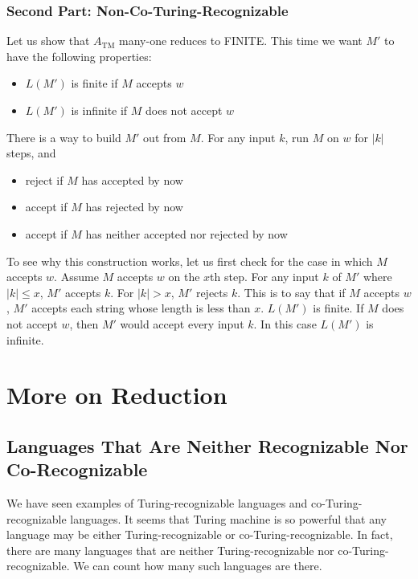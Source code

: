 \documentclass[11pt]{article}
\begin{document}
\subsubsection{Second Part: Non-Co-Turing-Recognizable}

Let us show that $A_{\mathrm{TM}}$ many-one reduces to FINITE. This time we want $M'$ to have the following
properties:
\begin{itemize}
\item $L(M')$ is finite if $M$ accepts $w$
\item $L(M')$ is infinite if $M$ does not accept $w$
\end{itemize}

There is a way to build $M'$ out from $M$. For any input $k$, run $M$ on $w$ for $|k|$ steps, and
\begin{itemize}
\item reject if $M$ has accepted by now
\item accept if $M$ has rejected by now
\item accept if $M$ has neither accepted nor rejected by now
\end{itemize}

To see why this construction works, let us first check for the case in which $M$ accepts $w$. Assume
$M$ accepts $w$ on the $x$th step. For any input $k$ of $M'$ where $|k| \leq x$, $M'$ accepts $k$.
For $|k| > x$, $M'$ rejects $k$. This is to say that if $M$ accepts $w$, $M'$ accepts each string
whose length is less than $x$. $L(M')$ is finite. If $M$ does not accept $w$, then $M'$ would accept
every input $k$. In this case $L(M')$ is infinite.

\section{More on Reduction}

\subsection{Languages That Are Neither Recognizable Nor Co-Recognizable}

We have seen examples of Turing-recognizable languages and co-Turing-recognizable languages. It seems
that Turing machine is so powerful that any language may be either Turing-recognizable or
co-Turing-recognizable. In fact, there are many languages that are neither Turing-recognizable
nor co-Turing-recognizable. We can count how many such languages are there.
\end{document}
